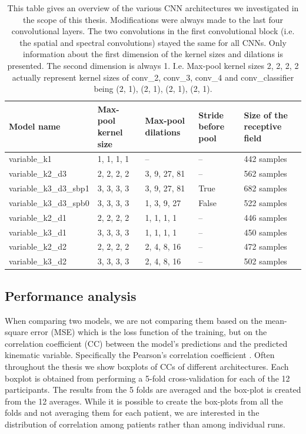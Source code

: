 \begin{table}[!htpb]
\centering
\begin{tabular}{|p{3.7cm}|p{1.7cm}|p{2cm}|p{1.2cm}|p{2.5cm}|}
\toprule
Model name & Max-pool kernel size & Max-pool dilations & Stride before pool & Size of the receptive field \\
\midrule
variable\_k1 & 1, 1, 1, 1 & -- & -- & 442 samples \\
\hline
variable\_k2\_d3 & 2, 2, 2, 2 & 3, 9, 27, 81 & -- & 562 samples \\
\hline
variable\_k3\_d3\_sbp1 & 3, 3, 3, 3 & 3, 9, 27, 81 & True & 682 samples \\
\hline
variable\_k3\_d3\_spb0 & 3, 3, 3, 3  & 1, 3, 9, 27 & False & 522 samples \\
\hline
variable\_k2\_d1 & 2, 2, 2, 2 & 1, 1, 1, 1 & -- & 446 samples \\
\hline
variable\_k3\_d1 & 3, 3, 3, 3  & 1, 1, 1, 1 & -- & 450 samples \\
\hline
variable\_k2\_d2 & 2, 2, 2, 2 & 2, 4, 8, 16 & -- & 472 samples \\
\hline
variable\_k3\_d2 & 3, 3, 3, 3 & 2, 4, 8, 16 & -- & 502 samples \\
\hline
\bottomrule
\end{tabular}
\caption[Architectural modifications]{This table gives an overview of the various CNN architectures we investigated in the scope of this thesis. Modifications were always made to the last four convolutional layers. The two convolutions in the first convolutional block (i.e. the spatial and spectral convolutions) stayed the same for all CNNs. Only information about the first dimension of the kernel sizes and dilations is presented. The second dimension is always 1. I.e. Max-pool kernel sizes 2, 2, 2, 2 actually represent kernel sizes of conv\_2, conv\_3, conv\_4 and conv\_classifier being (2, 1), (2, 1), (2, 1), (2, 1). }
\label{tab:architectures-description}
\end{table}

\subsection{Performance analysis}\label{subsec:performance-analysis}
When comparing two models, we are not comparing them based on the mean-square error (MSE) which is the loss function of the training, but on the correlation coefficient (CC) between the model's predictions and the predicted kinematic variable.
Specifically the Pearson's correlation coefficient \cite{pearson-vii-1895}.
Often throughout the thesis we show boxplots of CCs of different architectures.
Each boxplot is obtained from performing a 5-fold cross-validation for each of the 12 participants.
The results from the 5 folds are averaged and the box-plot is created from the 12 averages.
While it is possible to create the box-plots from all the folds and not averaging them for each patient, we are interested in the distribution of correlation among patients rather than among individual runs.